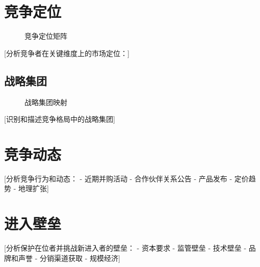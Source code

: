 \documentclass[11pt,letterpaper]{report}
\begin{document}
{\section{竞争定位}


\begin{figure}[htbp]
\centering
\caption{竞争定位矩阵}
\label{fig:competitive_positioning}
\end{figure}

[分析竞争者在关键维度上的市场定位：]

\subsection{战略集团}


\begin{figure}[htbp]
\centering
\caption{战略集团映射}
\label{fig:strategic_groups}
\end{figure}

[识别和描述竞争格局中的战略集团]

\section{竞争动态}

[分析竞争行为和动态：
- 近期并购活动
- 合作伙伴关系公告
- 产品发布
- 定价趋势
- 地理扩张]

\section{进入壁垒}

[分析保护在位者并挑战新进入者的壁垒：
- 资本要求
- 监管壁垒
- 技术壁垒
- 品牌和声誉
- 分销渠道获取
- 规模经济]

}
\end{document}

